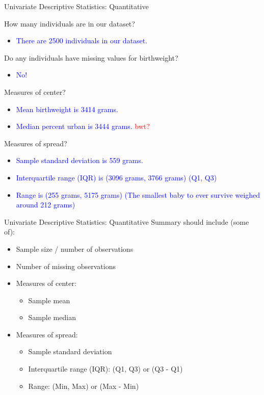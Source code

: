 \documentclass[10pt,t]{beamer}
\begin{document}
\begin{frame}{Univariate Descriptive Statistics: Quantitative}

How many individuals are in our dataset?

\begin{itemize}
	\item[] \textcolor{blue}{There are 2500 individuals in our dataset.}
\end{itemize}

Do any individuals have missing values for birthweight?

\begin{itemize}
	\item[] \textcolor{blue}{No!}
\end{itemize}

Measures of center?

\begin{itemize}
	\item[] \textcolor{blue}{Mean birthweight is 3414 grams.}
	\item[] \textcolor{blue}{Median percent urban is 3444 grams. \textcolor{red}{bwt?}} 
\end{itemize}

Measures of spread?

\begin{itemize}
	\item[] \textcolor{blue}{Sample standard deviation is 559 grams.}
	\item[] \textcolor{blue}{Interquartile range (IQR) is (3096 grams, 3766 grams) (Q1, Q3)}
	\item[] \textcolor{blue}{Range is (255 grams, 5175 grams) (The smallest baby to ever survive weighed around 212 grams)}
\end{itemize}


\end{frame}
	
\begin{frame}{Univariate Descriptive Statistics: Quantitative}
Summary should include (some of):

\vspace{0.3cm}

\begin{itemize}
	\item Sample size / number of observations
	\item Number of missing observations
	\item Measures of center:
	\begin{itemize}
		\item Sample mean
		\item Sample median
	\end{itemize}
	\item Measures of spread:
	\begin{itemize}
		\item Sample standard deviation
		\item Interquartile range (IQR): (Q1, Q3) or (Q3 - Q1)
		\item Range: (Min, Max) or (Max - Min)
	\end{itemize}
\end{itemize}

\end{frame}
\end{document}
